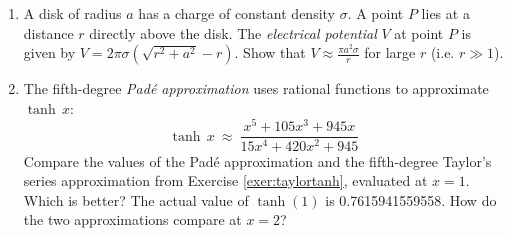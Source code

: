 {\begin{enumerate}[\bfseries 1.]
 \item A disk of radius $a$ has a charge of constant density $\sigma$. A point
 $P$ lies at a distance $r$ directly above the disk. The
 \emph{electrical potential} $V$ at point $P$ is given by
 $V = 2\pi\sigma(\sqrt{r^2 + a^2} - r)$. Show that
 $V \approx \frac{\pi a^2 \sigma}{r}$ for large $r$ (i.e. $r \gg 1$).
 \item The fifth-degree \emph{Pad\'{e} approximation} uses rational functions to
  approximate $\tanh\,x$:
\[
 \tanh\,x ~\approx~ \frac{x^5 + 105x^3 + 945x}{15x^4 + 420x^2 + 945}
\]
 Compare the values of the Pad\'{e} approximation and the fifth-degree Taylor's
 series approximation from Exercise \ref{exer:taylortanh}, evaluated at $x=1$.
 Which is better? The actual value of $\tanh (1)$ is 0.7615941559558. How do
 the two approximations compare at $x=2$?
\end{enumerate}
}
